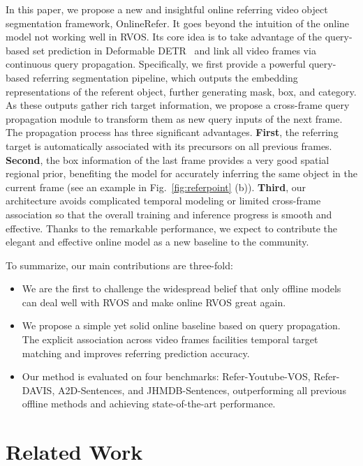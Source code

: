 \documentclass[10pt,twocolumn,letterpaper]{article}
\begin{document}
In this paper, we propose a new and insightful online referring video object segmentation framework, OnlineRefer.
It goes beyond the intuition of the online model not working well in RVOS.
Its core idea is to take advantage of the query-based set prediction in Deformable DETR~\cite{deformable} and 
link all video frames via continuous query propagation.
Specifically, we first provide a powerful query-based referring segmentation pipeline, which outputs the embedding representations of the referent object, further generating mask, box, and category.
As these outputs gather rich target information, we propose a cross-frame query propagation module to transform them as new query inputs of the next frame.
The propagation process has three significant advantages. 
\textbf{First}, the referring target is automatically associated with its precursors on all previous frames.
\textbf{Second}, the box information of the last frame provides a very good spatial regional prior, benefiting the model for accurately inferring the same object in the current frame (see an example in Fig.~\ref{fig:referpoint} (b)).
\textbf{Third}, our architecture avoids complicated temporal modeling or limited cross-frame association so that the overall training and inference progress is smooth and effective.
Thanks to the remarkable performance, we expect to contribute the elegant and effective online model as a new baseline to the community.

To summarize, our main contributions are three-fold:
\begin{itemize}
  \item We are the first to challenge the widespread belief that only offline models can deal well with RVOS and make online RVOS great again.
  \item We propose a simple yet solid online baseline based on query propagation. The explicit association across video frames facilities temporal target matching and improves referring prediction accuracy.
\item Our method is evaluated on four benchmarks: Refer-Youtube-VOS, Refer-DAVIS, A2D-Sentences,  and JHMDB-Sentences, outperforming all previous offline methods and achieving state-of-the-art performance. 
\end{itemize}





\section{Related Work}
\end{document}
